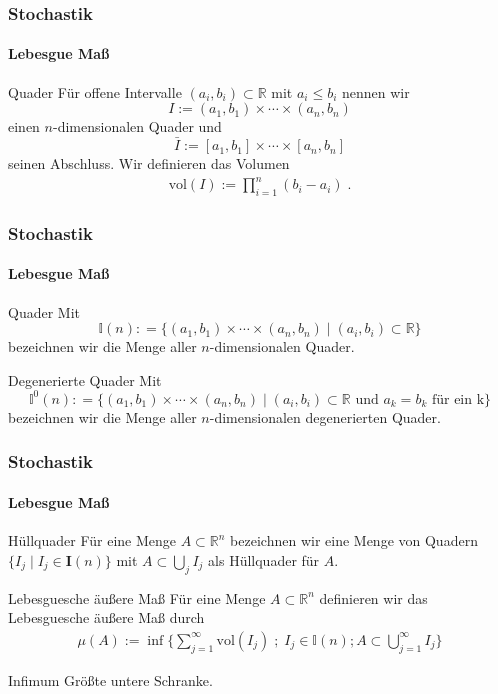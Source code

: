 \documentclass{beamer}
\begin{document}
\begin{frame}
    \frametitle{Stochastik}
\framesubtitle{Lebesgue Maß}
    \begin{block}{Quader}
Für offene Intervalle $(a_i,b_i) \subset \mathbb{R}$ mit $a_i \leq b_i$ nennen wir 
$$I := (a_1,b_1) \times \cdots \times (a_n,b_n)$$ 
einen $n$-dimensionalen Quader und 
$$\bar{I}:= [a_1, b_1] \times \cdots \times [a_n,b_n]$$
 seinen Abschluss. Wir definieren das Volumen 
\begin{align*}
\text{vol} (I):=   \prod_{i = 1}^n (b_i -a_i)  \; .
\end{align*}

\end{block}
 \end{frame}



\begin{frame}
    \frametitle{Stochastik}
\framesubtitle{Lebesgue Maß}
    \begin{block}{Quader}
Mit $$\mathbb{I}(n): = \{   (a_1,b_1) \times \cdots \times (a_n,b_n) \; | \;  (a_i, b_i) \subset \mathbb{R} \}$$ bezeichnen wir die Menge aller $n$-dimensionalen Quader. 
\end{block}
    \begin{block}{Degenerierte Quader}
Mit $$\mathbb{I}^0(n): = \{   (a_1,b_1) \times \cdots \times (a_n,b_n) \; | \;  (a_i, b_i) \subset \mathbb{R}  \text { und } a_k = b_k \text{ für ein k}\}$$ bezeichnen wir die Menge aller $n$-dimensionalen degenerierten Quader. 
\end{block}
 
 \end{frame}



\begin{frame}
    \frametitle{Stochastik}
\framesubtitle{Lebesgue Maß}

    \begin{block}{Hüllquader}
Für eine Menge $A \subset \mathbb{R}^n$ bezeichnen wir eine Menge von Quadern $\{ I_j \; | \;  I_j \in \mathbf{I}(n)  \}$ mit $A \subset \bigcup_j I_j$ als Hüllquader für $A$.
\end{block}

    \begin{block}{ Lebesguesche äußere Maß}
Für eine Menge $A \subset \mathbb{R}^n$ definieren wir das Lebesguesche äußere Maß durch 
\begin{align*}
\mu (A):=   \inf \biggl \{ \sum_{j=1}^{\infty}   \text{vol} (I_j)\; ; \; I_j \in \mathbb{I}(n); A \subset \bigcup_{j= 1}^{\infty} I_j \biggr \} 
\end{align*}
\end{block}
    \begin{block}{Infimum}
Größte untere Schranke.
\end{block}
 \end{frame}
\end{document}
